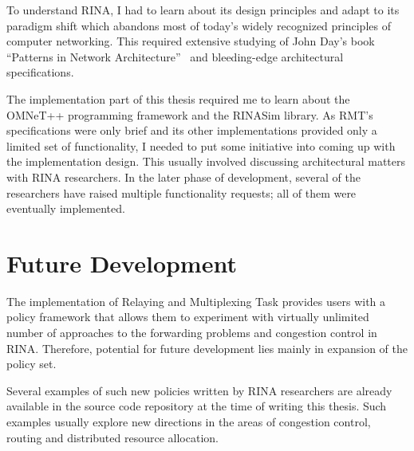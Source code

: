     To understand RINA, I had to learn about its design principles and adapt to its paradigm shift which abandons most of today's widely recognized principles of computer networking. This required extensive studying of John Day's book ``Patterns in Network Architecture''~\cite{Patterns} and bleeding-edge architectural specifications.

    The implementation part of this thesis required me to learn about the OMNeT++ programming framework and the RINASim library. As RMT's specifications were only brief and its other implementations provided only a limited set of functionality, I needed to put some initiative into coming up with the implementation design. This usually involved discussing architectural matters with RINA researchers. In the later phase of development, several of the researchers have raised multiple functionality requests; all of them were eventually implemented.

    \section{Future Development}

    The implementation of Relaying and Multiplexing Task provides users with a policy framework that allows them to experiment with virtually unlimited number of approaches to the forwarding problems and congestion control in RINA. Therefore, potential for future development lies mainly in expansion of the policy set.

    Several examples of such new policies written by RINA researchers are already available in the source code repository at the time of writing this thesis. Such examples usually explore new directions in the areas of congestion control, routing and distributed resource allocation.



